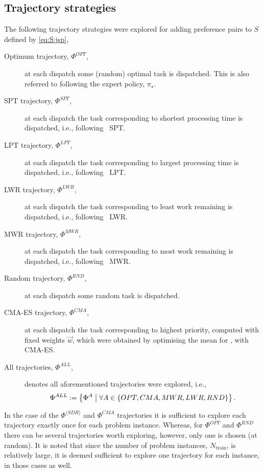 \subsection{Trajectory strategies}\label{sec:trdat:param:tracks}
The following trajectory strategies were explored for adding preference pairs 
to $S$ defined by \cref{eq:S:jsp},
\begin{description}
    \item[Optimum trajectory, $\Phi^{OPT}$,] at each dispatch some (random) 
    optimal task is dispatched. This is also referred to following the expert 
    policy, $\pi_\star$.	\item[SPT trajectory, $\Phi^{SPT}$,] at each 
    dispatch 
    the task 
    corresponding to shortest processing time is dispatched, i.e., following 
    \sdr~SPT.
    \item[LPT trajectory, $\Phi^{LPT}$,] at each dispatch the task 
    corresponding to largest processing time is dispatched, i.e., following 
    \sdr~LPT.
    \item[LWR trajectory, $\Phi^{LWR}$,] at each dispatch the task 
    corresponding to least work remaining is dispatched, i.e., following 
    \sdr~LWR.
    \item[MWR trajectory, $\Phi^{MWR}$,] at each dispatch the task 
    corresponding to most work remaining is dispatched, i.e., following 
    \sdr~MWR.
    \item[Random trajectory, $\Phi^{RND}$,] at each dispatch some random task 
    is dispatched.
    \item[CMA-ES trajectory, $\Phi^{CMA}$,] at each dispatch the task 
    corresponding to highest priority, computed with fixed weights $\vec{w}$, 
    which were obtained by optimising the mean for \fullnamerho, with CMA-ES. 
    \item[All trajectories, $\Phi^{ALL}$,] denotes all aforementioned 
    trajectories were explored, i.e., 
    \begin{equation}
    \Phi^{ALL}:=\left\{\Phi^{A}\;\middle|\;\forall A \in \{OPT,CMA,MWR,LWR,RND\}\right\}.
    \end{equation}
\end{description}
In the case of the $\Phi^{\langle SDR \rangle}$ and $\Phi^{CMA}$ trajectories 
it is sufficient to explore each trajectory exactly once for each problem 
instance. Whereas, for $\Phi^{OPT}$ and $\Phi^{RND}$ there can be several 
trajectories worth exploring, however, only one is chosen (at random). It is 
noted that since the number of problem instances, $N_{\text{train}}$, is 
relatively large, it is deemed sufficient to explore one trajectory for each 
instance, in those cases as well.

